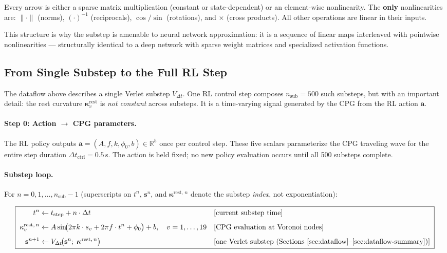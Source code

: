 \documentclass[11pt]{article}
\newcommand{\vect}[1]{\mathbf{#1}}
\newcommand{\Real}{\mathbb{R}}
\begin{document}
\noindent
Every arrow is either a sparse matrix multiplication (constant or state-dependent) or an element-wise nonlinearity.
The \textbf{only} nonlinearities are: $\|\cdot\|$ (norms), $(\cdot)^{-1}$ (reciprocals), $\cos/\sin$ (rotations), and $\times$ (cross products).
All other operations are linear in their inputs.

This structure is why the substep is amenable to neural network approximation: it is a sequence of linear maps interleaved with pointwise nonlinearities --- structurally identical to a deep network with sparse weight matrices and specialized activation functions.

\subsection{From Single Substep to the Full RL Step}
\label{sec:full-rl-step}

The dataflow above describes a single Verlet substep $V_{\Delta t}$.
One RL control step composes $n_{\text{sub}} = 500$ such substeps, but with an important detail: the rest curvature $\bm{\kappa}_v^{\text{rest}}$ is \emph{not constant} across substeps.
It is a time-varying signal generated by the CPG from the RL action $\vect{a}$.

\paragraph{Step 0: Action $\to$ CPG parameters.}
The RL policy outputs $\vect{a} = (A, f, k, \phi_0, b) \in \Real^5$ once per control step.
These five scalars parameterize the CPG traveling wave for the entire step duration $\Delta t_{\text{ctrl}} = 0.5$\,s.
The action is held fixed; no new policy evaluation occurs until all 500 substeps complete.

\paragraph{Substep loop.}
For $n = 0, 1, \ldots, n_{\text{sub}} - 1$
(superscripts on $t^n$, $\vect{s}^n$, and $\bm{\kappa}^{\text{rest},\,n}$ denote the substep \emph{index}, not exponentiation):

\begin{equation}
  \boxed{\;
  \begin{aligned}
    t^n &\leftarrow t_{\text{step}} + n \cdot \Delta t
      && [\text{current substep time}] \\[4pt]
    \kappa_v^{\text{rest},\,n} &\leftarrow A \sin\!\bigl(2\pi k \cdot s_v + 2\pi f \cdot t^n + \phi_0\bigr) + b,
      \quad v = 1, \ldots, 19
      && [\text{CPG evaluation at Voronoi nodes}] \\[4pt]
    \vect{s}^{n+1} &\leftarrow V_{\Delta t}\!\bigl(\vect{s}^{n};\; \bm{\kappa}^{\text{rest},\,n}\bigr)
      && [\text{one Verlet substep (Sections~\ref{sec:dataflow}--\ref{sec:dataflow-summary})}]
  \end{aligned}
  \;}
  \label{eq:rl-step-loop}
\end{equation}
\end{document}
